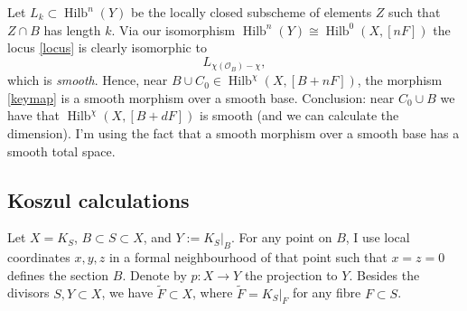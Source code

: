 \documentclass{amsart}
\theoremstyle{definition}
\renewcommand{\O}{\mathcal{O}}
\newcommand{\Hilb}{\operatorname{Hilb}}
\begin{document}
Let $L_k \subset \Hilb^n(Y)$ be the locally closed subscheme of elements $Z$ such that $Z \cap B$ has length $k$. Via our isomorphism $\Hilb^n(Y) \cong \Hilb^0(X,[nF])$ the locus \eqref{locus} is clearly isomorphic to 
$$
L_{\chi(\O_B) - \chi},
$$
which is \emph{smooth}. Hence, near $B \cup C_0 \in \Hilb^\chi(X,[B+nF])$, the morphism \eqref{keymap} is a smooth morphism over a smooth base. Conclusion: near $C_0 \cup B$ we have that $\Hilb^\chi(X,[B+dF])$ is smooth (and we can calculate the dimension). I'm using the fact that a smooth morphism over a smooth base has a smooth total space.

\subsection{Koszul calculations}

Let $X = K_S$, $B \subset S \subset X$, and $Y:=K_S|_B$. For any point on $B$, I use local coordinates $x,y,z$ in a formal neighbourhood of that point such that $x=z=0$ defines the section $B$. Denote by $p : X \rightarrow Y$ the projection to $Y$. Besides the divisors $S,Y \subset X$, we have $\tilde{F} \subset X$, where $\tilde{F} = K_S|_F$ for any fibre $F \subset S$.
\end{document}
